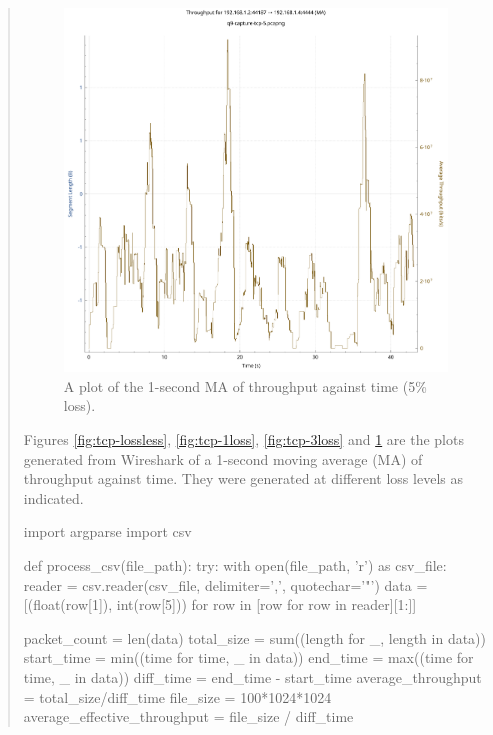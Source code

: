 \documentclass{article}
\newenvironment{ans}
   {\fbox{Answer}\begin{quote}\nopagebreak}
   {\end{quote}}
\begin{document}
\begin{ans}
\begin{figure}[H]
\centering
\includegraphics[width=16cm]{data/q9-1msav-throughput-5loss.pdf}
\caption{A plot of the 1-second MA of throughput against time
(5\% loss).}
\label{fig:tcp-5loss}
\end{figure}


Figures \ref{fig:tcp-lossless}, \ref{fig:tcp-1loss},
\ref{fig:tcp-3loss} and \ref{fig:tcp-5loss} are the plots
generated from Wireshark of a 1-second moving average (MA) of
throughput against time. They were generated at different loss
levels as indicated.

\begin{gruvboxlisting}[language=Python,caption={A Python script for computing a
number of statistics about any Wireshark capture.},label={lst:python-scritp}]
import argparse
import csv

def process_csv(file_path):
    try:
        with open(file_path, 'r') as csv_file:
            reader = csv.reader(csv_file, delimiter=',', quotechar='"')
            data = [(float(row[1]), int(row[5])) for row in [row for row in reader][1:]]
        

        packet_count = len(data)
        total_size = sum((length for _, length in data))
        start_time = min((time for time, _ in data))
        end_time = max((time for time, _ in data))
        diff_time = end_time - start_time
        average_throughput = total_size/diff_time
        file_size = 100*1024*1024
        average_effective_throughput = file_size / diff_time


\end{gruvboxlisting}
\end{ans}
\end{document}
